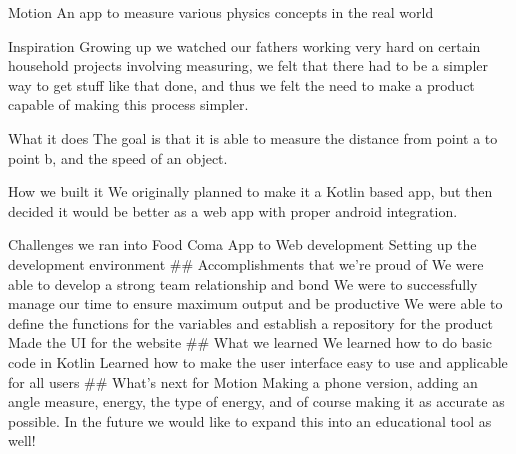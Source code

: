 Motion
An app to measure various physics concepts in the real world

Inspiration
Growing up we watched our fathers working very hard on certain household projects involving measuring, we felt that there had to be a simpler way to get stuff like that done, and thus we felt the need to make a product capable of making this process simpler.

What it does
The goal is that it is able to measure the distance from point a to point b, and the speed of an object.

How we built it
We originally planned to make it a Kotlin based app, but then decided it would be better as a web app with proper android integration.

Challenges we ran into
Food Coma
App to Web development
Setting up the development environment ## Accomplishments that we're proud of
We were able to develop a strong team relationship and bond
We were to successfully manage our time to ensure maximum output and be productive
We were able to define the functions for the variables and establish a repository for the product
Made the UI for the website ## What we learned
We learned how to do basic code in Kotlin
Learned how to make the user interface easy to use and applicable for all users ## What's next for Motion Making a phone version, adding an angle measure, energy, the type of energy, and of course making it as accurate as possible. In the future we would like to expand this into an educational tool as well!

